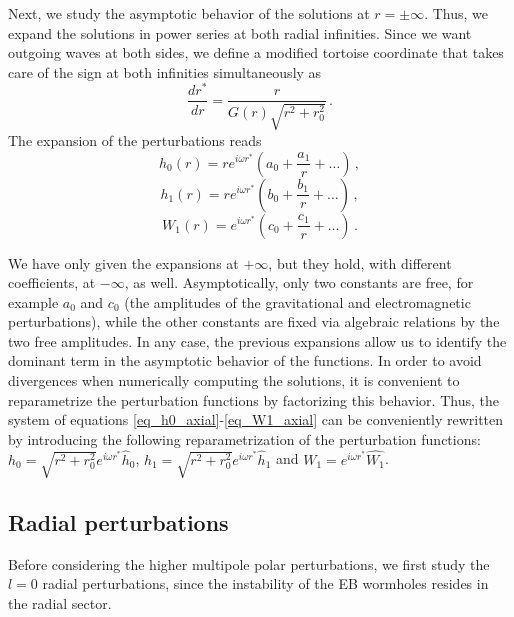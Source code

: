 \documentclass[11pt,a4paper]{article}
\begin{document}
Next, we study the asymptotic behavior of the solutions at $r=\pm\infty$. 
Thus, we expand the solutions in power series at both radial infinities. 
Since we want outgoing waves at both sides, we define a modified tortoise coordinate that takes care of the sign at both infinities simultaneously as
%
\begin{equation}\label{tortoise}
    \frac{dr^*}{dr}=\frac{r}{G(r)\sqrt{r^2+r_0^2}} \, .
\end{equation}
%
The expansion of the perturbations reads
%
\begin{equation}
    h_0(r)=re^{i\omega r^*}\left(a_0+\frac{a_1}{r}+\dots\right) \,,
\end{equation}
%
\begin{equation}
    h_1(r)=re^{i\omega r^*}\left(b_0+\frac{b_1}{r}+\dots\right) \,,
\end{equation}
%
\begin{equation}
    W_1(r)=e^{i\omega r^*}\left(c_0+\frac{c_1}{r}+\dots\right) \,.
\end{equation}

We have only given the expansions at $+\infty$, but they hold,
with different coefficients,
at $-\infty$, as well. 
Asymptotically, only two constants are free, for example $a_0$ and $c_0$ (the amplitudes of the gravitational and electromagnetic perturbations), while the other constants are fixed via algebraic relations by the two free amplitudes.
In any case, the previous expansions allow us to identify the dominant term in the asymptotic behavior of the functions. In order to avoid divergences when numerically computing the solutions, it is convenient to reparametrize the perturbation functions by factorizing this behavior. 
Thus, the system of equations \eqref{eq_h0_axial}-\eqref{eq_W1_axial} can be conveniently rewritten
by introducing the following reparametrization of the perturbation functions:
$h_0 = \sqrt{r^2+r_0^2}e^{i\omega r^*}\hat{h}_0$, 
$h_1 = \sqrt{r^2+r_0^2}e^{i\omega r^*}\hat{h}_1$
and 
$W_1 = e^{i\omega r^*}\hat{W_1}$.


\subsection{Radial perturbations}


Before considering the higher multipole polar perturbations, we first study the $l=0$ radial perturbations, since the instability of the EB wormholes resides in the radial sector. 
\end{document}
